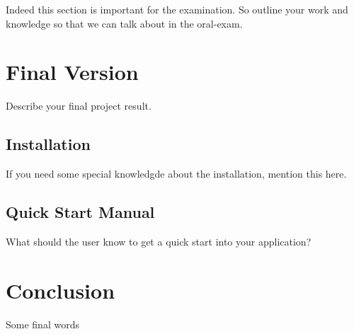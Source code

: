 \documentclass{scrreprt}
\begin{document}
Indeed this section is important for the examination. So outline your work and knowledge so that we can talk about in the oral-exam.


\chapter{Final Version}
Describe your final project result.


\section{Installation}
If you need some special knowledgde about the installation, mention this here.


\section{Quick Start Manual}
What should the user know to get a quick start into your application?


\chapter{Conclusion}
Some final words


\printbibliography
\end{document}
